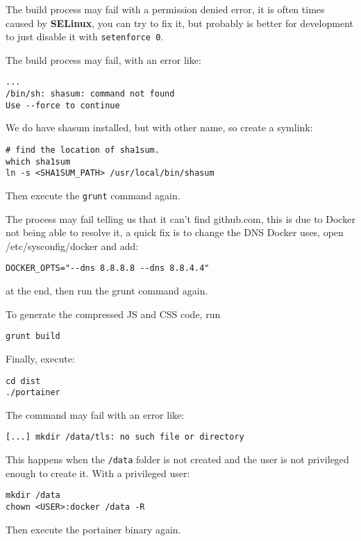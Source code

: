\begin{story}
The build process may fail with a permission denied error, it is often times caused by \textbf{SELinux}, you can try to fix it, but probably is better for development to just disable it with \texttt{setenforce 0}.
\end{story}



\begin{story}
The build process may fail, with an error like:

\begin{lstlisting}
...
/bin/sh: shasum: command not found
Use --force to continue
\end{lstlisting}

We do have shasum installed, but with other name, so create a symlink:

\begin{lstlisting}
# find the location of sha1sum.
which sha1sum
ln -s <SHA1SUM_PATH> /usr/local/bin/shasum
\end{lstlisting}

Then execute the \texttt{grunt} command again.
\end{story}


\begin{story}
The process may fail telling us that it can't find github.com, this is due to Docker not being able to resolve it, a quick fix is to change the DNS Docker uses, open /etc/sysconfig/docker and add:

\begin{lstlisting}
DOCKER_OPTS="--dns 8.8.8.8 --dns 8.8.4.4"
\end{lstlisting}

at the end, then run the grunt command again.
\end{story}

To generate the compressed JS and CSS code, run

\begin{lstlisting}
grunt build
\end{lstlisting}

Finally, execute:

\begin{lstlisting}
cd dist
./portainer
\end{lstlisting}


\begin{story}
The command may fail with an error like:

\begin{lstlisting}
[...] mkdir /data/tls: no such file or directory
\end{lstlisting}

This happens when the \texttt{/data} folder is not created and the user is not privileged enough to create it. With a privileged user:

\begin{lstlisting}
mkdir /data
chown <USER>:docker /data -R
\end{lstlisting}

Then execute the portainer binary again.
\end{story}

